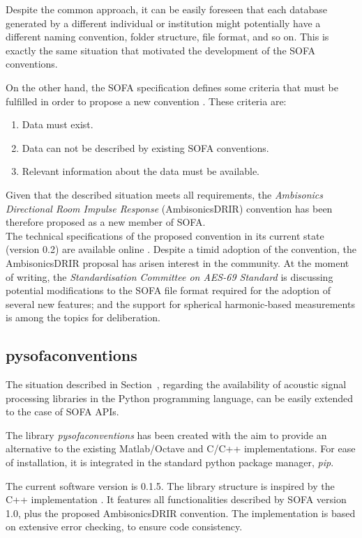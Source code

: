 Despite the common approach, it can be easily foreseen that each database generated by a different individual or institution might potentially have a different naming convention, folder structure, file format, and so on. 
This is exactly the same situation that motivated the development of the SOFA conventions. 

On the other hand, the SOFA specification defines some criteria that must be fulfilled in order to propose a new convention \cite{sofaconventions}. These criteria are:
\begin{enumerate}
    \item Data must exist.
    \item Data can not be described by existing SOFA conventions.
    \item Relevant information about the data must be available.
\end{enumerate} 

Given that the described situation meets all requirements, the \textit{Ambisonics Directional Room Impulse Response} (AmbisonicsDRIR) convention has been therefore proposed as a new member of SOFA.\\

The technical specifications of the proposed convention in its current state (version 0.2) are available online \cite{ambisonicsdrir}. 
Despite a timid adoption of the convention, the AmbisonicsDRIR proposal has arisen interest in the community. At the moment of writing, the \textit{Standardisation Committee on AES-69 Standard} is discussing potential modifications to the SOFA file format required for the adoption of several new features; and the support for spherical harmonic-based measurements is among the topics for deliberation.


\subsection{pysofaconventions}

The situation described in Section~\label{sec:intro_data}, regarding the availability of acoustic signal processing libraries in the Python programming language, can be easily extended to the case of SOFA APIs.
 
The library \textit{pysofaconventions} has been created with the aim to provide an alternative to the existing Matlab/Octave and C/C++ implementations. 
For ease of installation, it is integrated in the standard python package manager, \textit{pip}. 

The current software version is 0.1.5. The library structure is inspired by the C++ implementation \cite{api_cpp}. 
It features all functionalities described by SOFA version 1.0, plus the proposed AmbisonicsDRIR convention. 
The implementation is based on extensive error checking, to ensure code consistency.
 
